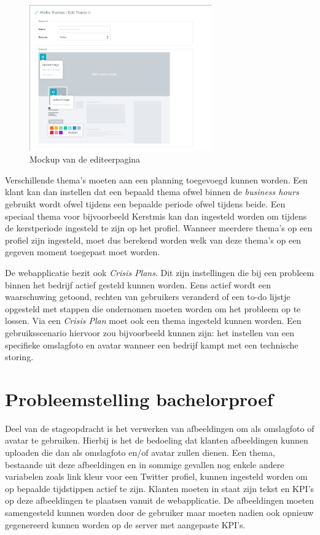 \begin{figure}[H]
	\centering
	\includegraphics[width=0.7\textwidth]{Figuren/EditThemeMockup.png}
	\caption{Mockup van de editeerpagina \cite{EditThemeMockup}} %
	\label{fig:EditTheme}
\end{figure} 

Verschillende thema's moeten aan een planning toegevoegd kunnen worden. Een klant kan dan instellen dat een bepaald thema ofwel binnen de \textit{business hours} gebruikt wordt ofwel tijdens een bepaalde periode ofwel tijdens beide. Een speciaal thema voor bijvoorbeeld Kerstmis kan dan ingesteld worden om tijdens de kerstperiode ingesteld te zijn op het profiel. Wanneer meerdere thema's op een profiel zijn ingesteld, moet dus berekend worden welk van deze thema's op een gegeven moment toegepast moet worden. 

\newpage
De webapplicatie bezit ook \textit{Crisis Plans}. Dit zijn instellingen die bij een probleem binnen het bedrijf actief gesteld kunnen worden. Eens actief wordt een waarschuwing getoond, rechten van gebruikers veranderd of een to-do lijstje opgesteld met stappen die ondernomen moeten worden om het probleem op te lossen. Via een \textit{Crisis Plan} moet ook een thema ingesteld kunnen worden. Een gebruiksscenario hiervoor zou bijvoorbeeld kunnen zijn: het instellen van een specifieke omslagfoto en avatar wanneer een bedrijf kampt met een technische storing. 

\section{Probleemstelling bachelorproef}

Deel van de stageopdracht is het verwerken van afbeeldingen om als omslagfoto of avatar te gebruiken. Hierbij is het de bedoeling dat klanten afbeeldingen kunnen uploaden die dan als omslagfoto en/of avatar zullen dienen. Een thema, bestaande uit deze afbeeldingen en in sommige gevallen nog enkele andere variabelen zoals link kleur voor een Twitter profiel, kunnen ingesteld worden om op bepaalde tijdstippen actief te zijn. Klanten moeten in staat zijn tekst en KPI's op deze afbeeldingen te plaatsen vanuit de webapplicatie. De afbeeldingen moeten samengesteld kunnen worden door de gebruiker maar moeten nadien ook opnieuw gegenereerd kunnen worden op de server met aangepaste KPI's. 

